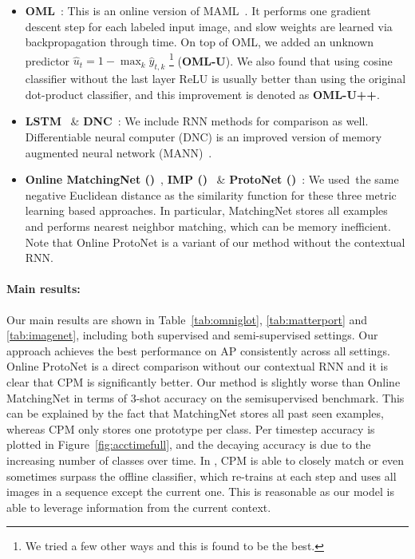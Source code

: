 \begin{itemize}[leftmargin=*]
    \item \textbf{OML}~\citep{oml}: This is an online version of MAML~\citep{maml}. It performs one
    gradient descent step for each labeled input image, and slow weights are learned via
    backpropagation through time. On top of OML, we added an unknown predictor $\hat{u}_t = 1 -
    \max_k \hat{y}_{t,k}$ \footnote{We tried a few other ways and this is found to be the
    best.} (\textbf{OML-U}). We also found that using cosine classifier without the last layer ReLU
    is usually better than using the original dot-product classifier, and this improvement is denoted
    as \textbf{OML-U++}.
    \item \textbf{LSTM}~\citep{lstm} \& \textbf{DNC}~\citep{dnc}: We include RNN methods for
    comparison as well. Differentiable neural computer (DNC) is an improved version of memory
    augmented neural network (MANN)~\citep{mann}.
    \item \textbf{Online MatchingNet (\OnlineMatchingNet{})}~\citep{matchingnet}, 
    \textbf{IMP (\OnlineIMP{})}~\citep{imp} \&
    \textbf{ProtoNet (\OnlineProtoNet{})}~\citep{protonet}: We used\ the same negative Euclidean distance as the
    similarity function for these three metric learning based approaches.  In particular,
    MatchingNet stores all examples and performs nearest neighbor matching, which can be memory
    inefficient. Note that Online ProtoNet is a variant of our method without the contextual RNN.
\end{itemize}
\fi



\vspace{-0.1in}
\paragraph{Main results:} Our main results are shown in Table~\ref{tab:omniglot}, 
\ref{tab:matterport} and \ref{tab:imagenet}, including both supervised and semi-supervised settings. Our approach achieves
the best performance on AP consistently across all settings. Online ProtoNet is a direct comparison
without our contextual RNN and it is clear that CPM is significantly better. Our method is slightly
worse than Online MatchingNet in terms of 3-shot accuracy on the \ourroom{} semisupervised
benchmark. This can be explained by the fact that MatchingNet stores all past seen examples, whereas
CPM only stores one prototype per class. Per timestep accuracy is plotted in
Figure~\ref{fig:acctimefull}, and the decaying accuracy is due to the increasing number of classes
over time. In \ourchar{}, CPM is able to closely match or even sometimes surpass the offline
classifier, which re-trains at each step and uses all images in a sequence except the current one. This is
reasonable as our model is able to leverage information from the current context.

